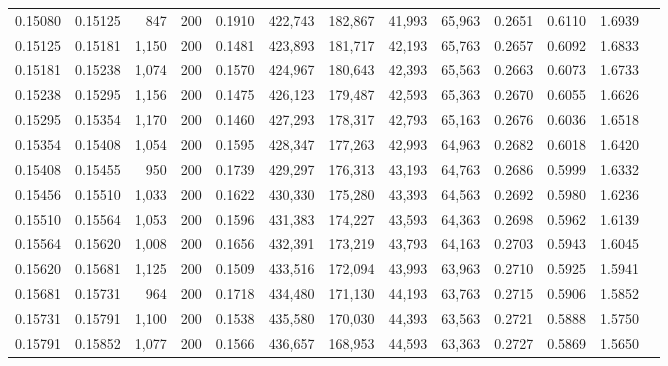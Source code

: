 \begin{tabular}{rrrrrrrrrrrrr}
0.15080 & 0.15125 &   847 & 200 &                                     0.1910 & 422,743 & 182,867 &  41,993 &  65,963 & 0.2651 & 0.6110 & 1.6939 \\
0.15125 & 0.15181 & 1,150 & 200 &                                     0.1481 & 423,893 & 181,717 &  42,193 &  65,763 & 0.2657 & 0.6092 & 1.6833 \\
0.15181 & 0.15238 & 1,074 & 200 &                                     0.1570 & 424,967 & 180,643 &  42,393 &  65,563 & 0.2663 & 0.6073 & 1.6733 \\
0.15238 & 0.15295 & 1,156 & 200 &                                     0.1475 & 426,123 & 179,487 &  42,593 &  65,363 & 0.2670 & 0.6055 & 1.6626 \\
0.15295 & 0.15354 & 1,170 & 200 &                                     0.1460 & 427,293 & 178,317 &  42,793 &  65,163 & 0.2676 & 0.6036 & 1.6518 \\
0.15354 & 0.15408 & 1,054 & 200 &                                     0.1595 & 428,347 & 177,263 &  42,993 &  64,963 & 0.2682 & 0.6018 & 1.6420 \\
0.15408 & 0.15455 &   950 & 200 &                                     0.1739 & 429,297 & 176,313 &  43,193 &  64,763 & 0.2686 & 0.5999 & 1.6332 \\
0.15456 & 0.15510 & 1,033 & 200 &                                     0.1622 & 430,330 & 175,280 &  43,393 &  64,563 & 0.2692 & 0.5980 & 1.6236 \\
0.15510 & 0.15564 & 1,053 & 200 &                                     0.1596 & 431,383 & 174,227 &  43,593 &  64,363 & 0.2698 & 0.5962 & 1.6139 \\
0.15564 & 0.15620 & 1,008 & 200 &                                     0.1656 & 432,391 & 173,219 &  43,793 &  64,163 & 0.2703 & 0.5943 & 1.6045 \\
0.15620 & 0.15681 & 1,125 & 200 &                                     0.1509 & 433,516 & 172,094 &  43,993 &  63,963 & 0.2710 & 0.5925 & 1.5941 \\
0.15681 & 0.15731 &   964 & 200 &                                     0.1718 & 434,480 & 171,130 &  44,193 &  63,763 & 0.2715 & 0.5906 & 1.5852 \\
0.15731 & 0.15791 & 1,100 & 200 &                                     0.1538 & 435,580 & 170,030 &  44,393 &  63,563 & 0.2721 & 0.5888 & 1.5750 \\
0.15791 & 0.15852 & 1,077 & 200 &                                     0.1566 & 436,657 & 168,953 &  44,593 &  63,363 & 0.2727 & 0.5869 & 1.5650 \\

\end{tabular}
